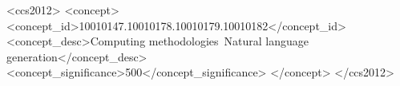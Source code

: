 \documentclass[sigconf]{acmart}
\begin{document}
\begin{CCSXML}
  <ccs2012>
     <concept>
        <concept_id>10010147.10010178.10010179.10010182</concept_id>
        <concept_desc>Computing methodologies~Natural language generation</concept_desc>
        <concept_significance>500</concept_significance>
      </concept>
  </ccs2012>
\end{CCSXML}
  



\maketitle
\end{document}
